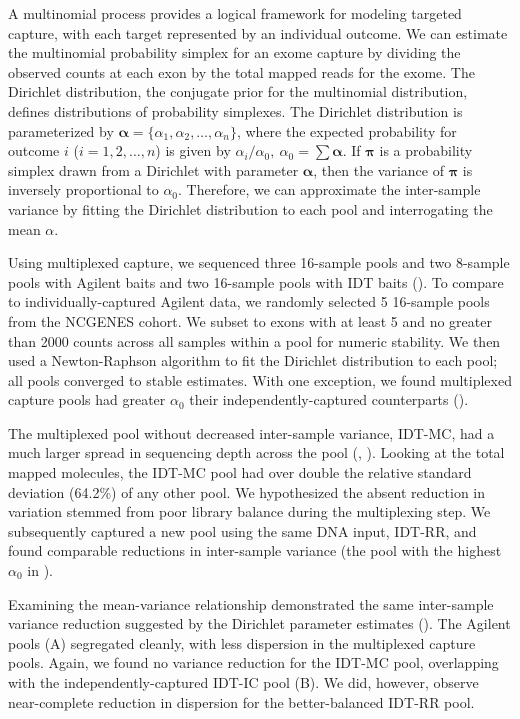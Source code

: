 \documentclass{bmcart}\usepackage[]{graphicx}\usepackage[]{color}
\begin{document}
A multinomial process provides a logical framework for modeling targeted capture, with each target represented by an individual outcome.
We can estimate the multinomial probability simplex for an exome capture by dividing the observed counts at each exon by the total mapped reads for the exome.
The Dirichlet distribution, the conjugate prior for the multinomial distribution, defines distributions of probability simplexes.
The Dirichlet distribution is parameterized by $\bm{\alpha} = \{\alpha_1, \alpha_2, \dots, \alpha_n\}$, where the expected probability for outcome $i$ ($i = 1, 2, \dots, n$) is given by $\alpha_i/\alpha_0,~\alpha_0 = \sum \bm\alpha$.
If $\bm\pi$ is a probability simplex drawn from a Dirichlet with parameter $\bm\alpha$, then the variance of $\bm\pi$ is inversely proportional to $\alpha_0$.
Therefore, we can approximate the inter-sample variance by fitting the Dirichlet distribution to each pool and interrogating the mean $\alpha$.

Using multiplexed capture, we sequenced three 16-sample pools and two 8-sample pools with Agilent baits and two 16-sample pools with IDT baits ().
To compare to individually-captured Agilent data, we randomly selected 5 16-sample pools from the NCGENES cohort.
We subset to exons with at least 5 and no greater than 2000 counts across all samples within a pool for numeric stability.
We then used a Newton-Raphson algorithm \cite{minka:2000aa} to fit the Dirichlet distribution to each pool; all pools converged to stable estimates.
With one exception, we found multiplexed capture pools had greater $\alpha_0$  their independently-captured counterparts ().

The multiplexed pool without decreased inter-sample variance, IDT-MC, had a much larger spread in sequencing depth across the pool (, ).
Looking at the total mapped molecules, the IDT-MC pool had over double the relative standard deviation (64.2\%) of any other pool.
We hypothesized the absent reduction in variation stemmed from poor library balance during the multiplexing step.
We subsequently captured a new pool using the same DNA input, IDT-RR, and found comparable reductions in inter-sample variance (the pool with the highest $\alpha_0$ in ).

Examining the mean-variance relationship demonstrated the same inter-sample variance reduction suggested by the Dirichlet parameter estimates ().
The Agilent pools (A) segregated cleanly, with less dispersion in the multiplexed capture pools.
Again, we found no variance reduction for the IDT-MC pool, overlapping with the independently-captured IDT-IC pool (B).
We did, however, observe near-complete reduction in dispersion for the better-balanced IDT-RR pool.
\end{document}
